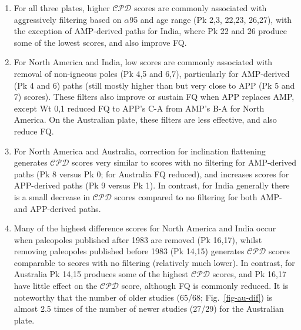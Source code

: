 %
\begin{enumerate}
  \item For all three plates, higher $\mathcal{CPD}$ scores are commonly
    associated with aggressively filtering based on $\alpha$95 and age range (Pk
    2,3, 22,23, 26,27), with the exception of AMP-derived paths for India, where
    Pk 22 and 26 produce some of the lowest scores, and also improve FQ\@.
  \item For North America and India, low scores are commonly associated with
    removal of non-igneous poles (Pk 4,5 and 6,7), particularly for AMP-derived
    (Pk 4 and 6) paths (still mostly higher than but very close to APP (Pk 5 and
    7) scores). These filters also improve or sustain FQ when APP replaces AMP,
    except Wt 0,1 reduced FQ to APP's C-A from AMP's B-A for North America. On
    the Australian plate, these filters are less effective, and also reduce
    FQ\@.
  \item For North America and Australia, correction for inclination flattening
    generates $\mathcal{CPD}$ scores very similar to scores with no filtering
    for AMP-derived paths (Pk 8 versus Pk 0; for Australia FQ reduced), and
    increases scores for APP-derived paths (Pk 9 versus Pk 1). In contrast, for
    India generally there is a small decrease in $\mathcal{CPD}$ scores compared
    to no filtering for both AMP- and APP-derived paths.
  \item Many of the highest difference scores for North America and India occur
    when paleopoles published after 1983 are removed (Pk 16,17), whilst removing
    paleopoles published before 1983 (Pk 14,15) generates $\mathcal{CPD}$ scores
    comparable to scores with no filtering (relatively much lower). In contrast,
    for Australia Pk 14,15 produces some of the highest $\mathcal{CPD}$ scores,
    and Pk 16,17 have little effect on the $\mathcal{CPD}$ score, although FQ is
    commonly reduced. It is noteworthy that the number of older studies (65/68;
    Fig.~\ref{fig-au-dif}) is almost 2.5 times of the number of newer studies
    (27/29) for the Australian plate.
\end{enumerate}

